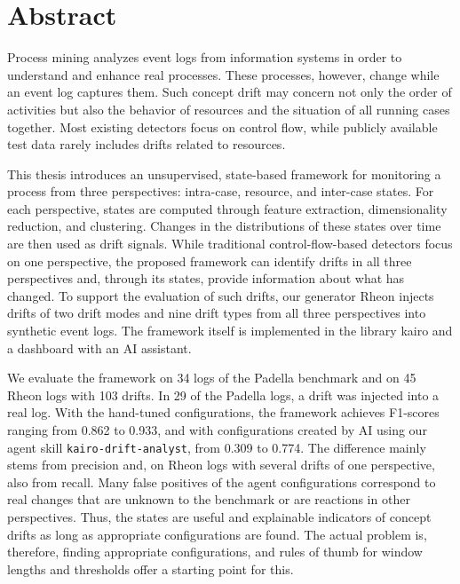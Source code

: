 \chapter*{Abstract}
Process mining analyzes event logs from information systems in order to understand and enhance real processes. These processes, however, change while an event log captures them. Such concept drift may concern not only the order of activities but also the behavior of resources and the situation of all running cases together. Most existing detectors focus on control flow, while publicly available test data rarely includes drifts related to resources.

This thesis introduces an unsupervised, state-based framework for monitoring a process from three perspectives: intra-case, resource, and inter-case states. For each perspective, states are computed through feature extraction, dimensionality reduction, and clustering. Changes in the distributions of these states over time are then used as drift signals. While traditional control-flow-based detectors focus on one perspective, the proposed framework can identify drifts in all three perspectives and, through its states, provide information about what has changed. To support the evaluation of such drifts, our generator Rheon injects drifts of two drift modes and nine drift types from all three perspectives into synthetic event logs. The framework itself is implemented in the library kairo and a dashboard with an AI assistant.

We evaluate the framework on 34 logs of the Padella benchmark and on 45 Rheon logs with 103 drifts. In 29 of the Padella logs, a drift was injected into a real log. With the hand-tuned configurations, the framework achieves F1-scores ranging from 0.862 to 0.933, and with configurations created by AI using our agent skill \texttt{kairo-drift-analyst}, from 0.309 to 0.774. The difference mainly stems from precision and, on Rheon logs with several drifts of one perspective, also from recall. Many false positives of the agent configurations correspond to real changes that are unknown to the benchmark or are reactions in other perspectives. Thus, the states are useful and explainable indicators of concept drifts as long as appropriate configurations are found. The actual problem is, therefore, finding appropriate configurations, and rules of thumb for window lengths and thresholds offer a starting point for this.